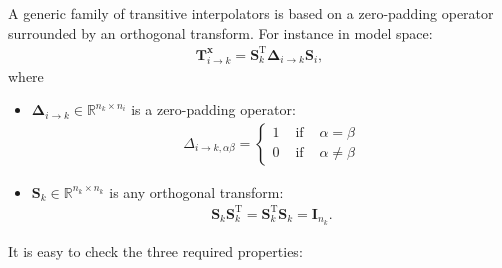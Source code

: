 \documentclass[npg, manuscript]{copernicus}
\begin{document}
A generic family of transitive interpolators is based on a zero-padding operator surrounded by an orthogonal transform. For instance in model space:
\begin{align}
\mathbf{T}^\mathbf{x}_{i \rightarrow k} = \mathbf{S}^\mathrm{T}_k \boldsymbol{\Delta}_{i \rightarrow k} \mathbf{S}_i,
\end{align}
where
\begin{itemize}
\item $\boldsymbol{\Delta}_{i \rightarrow k} \in \mathbb{R}^{n_k \times n_i}$ is a zero-padding operator:
\begin{align}
\Delta_{i \rightarrow k, \alpha \beta} = \left\{
\begin{array}{ccc}
1 & \text{ if } & \alpha = \beta \\
0 & \text{ if } & \alpha \ne \beta
\end{array}\right.
\end{align}
\item $\mathbf{S}_k \in \mathbb{R}^{n_k \times n_k}$ is any orthogonal transform:
\begin{align}
\mathbf{S}_k \mathbf{S}_k^\mathrm{T} = \mathbf{S}_k^\mathrm{T} \mathbf{S}_k = \mathbf{I}_{n_k}.
\end{align}
\end{itemize}
It is easy to check the three required properties:
\end{document}
